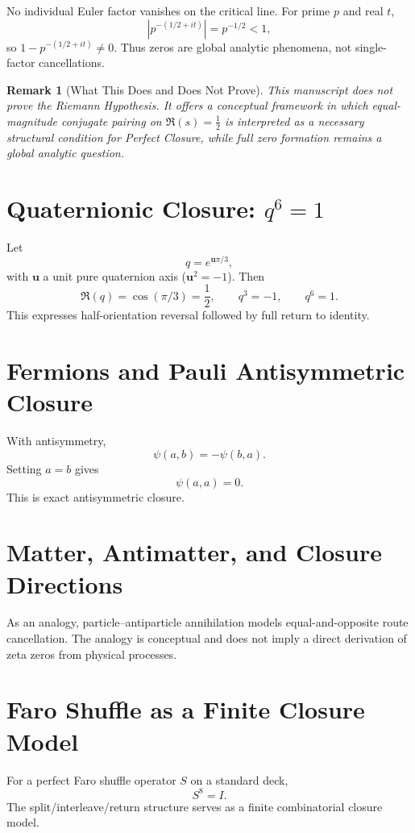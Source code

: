 \documentclass[11pt]{article}
\newtheorem{remark}[definition]{Remark}
\begin{document}
No individual Euler factor vanishes on the critical line. For prime $p$ and real $t$,
\[
\left|p^{-(1/2+it)}\right|=p^{-1/2}<1,
\]
so $1-p^{-(1/2+it)}\neq 0$. Thus zeros are global analytic phenomena, not single-factor cancellations.

\begin{remark}[What This Does and Does Not Prove]
This manuscript does not prove the Riemann Hypothesis. It offers a conceptual framework in which equal-magnitude conjugate pairing on $\Re(s)=\tfrac{1}{2}$ is interpreted as a necessary structural condition for Perfect Closure, while full zero formation remains a global analytic question.
\end{remark}

\section{Quaternionic Closure: $q^6=1$}

Let
\[
q=e^{\mathbf u\pi/3},
\]
with $\mathbf u$ a unit pure quaternion axis ($\mathbf u^2=-1$). Then
\[
\Re(q)=\cos(\pi/3)=\frac{1}{2},\qquad q^3=-1,\qquad q^6=1.
\]
This expresses half-orientation reversal followed by full return to identity.

\section{Fermions and Pauli Antisymmetric Closure}

With antisymmetry,
\[
\psi(a,b)=-\psi(b,a).
\]
Setting $a=b$ gives
\[
\psi(a,a)=0.
\]
This is exact antisymmetric closure.

\section{Matter, Antimatter, and Closure Directions}

As an analogy, particle--antiparticle annihilation models equal-and-opposite route cancellation. The analogy is conceptual and does not imply a direct derivation of zeta zeros from physical processes.

\section{Faro Shuffle as a Finite Closure Model}

For a perfect Faro shuffle operator $S$ on a standard deck,
\[
S^8=I.
\]
The split/interleave/return structure serves as a finite combinatorial closure model.
\end{document}

